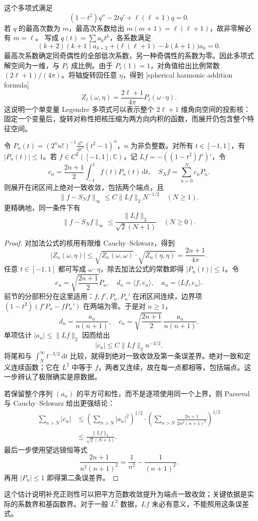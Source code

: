 \ProseParagraphBreak

这个多项式满足
\[
 (1-t^2)q''-2tq'+\ell(\ell+1)q=0.
\]
若 \(q\) 的最高次数为 \(m\)，最高次系数给出
\(m(m+1)=\ell(\ell+1)\)，故非零解必有 \(m=\ell\)。
写成 \(q(t)=\sum a_kt^k\)，各系数满足
\[
 (k+2)(k+1)a_{k+2}
       +\bigl(\ell(\ell+1)-k(k+1)\bigr)a_k=0.
\]
最高次系数确定同奇偶性的全部低次系数，另一种奇偶性的系数为零。因此多项式解空间为一维，与
\(P_\ell\) 成比例。由于 \(P_\ell(1)=1\)，对角值给出比例常数
\((2\ell+1)/(4\pi)\)。将轴旋转回任意 \(\eta\)，得到
[spherical harmonic addition formula]
\[
 Z_\ell(\omega,\eta)
       =\frac{2\ell+1}{4\pi}P_\ell(\omega\cdot\eta).
\]
这说明一个单变量 Legendre 多项式可以表示整个
\(2\ell+1\) 维角向空间的投影核：固定一个变量后，旋转对称性把核压缩为两方向内积的函数，而展开仍包含整个特征空间。

\begin{proposition}\label{b2:prop:B2-legendre-uniform}
令 \(P_n(t)=(2^nn!)^{-1}\frac{\mathrm d^n}{\mathrm dt^n}(t^2-1)^n\)，\(n\) 为非负整数。对所有 \(t\in[-1,1]\)，有 \(|P_n(t)|\leq1\)。若 \(f\in C^2([-1,1];\mathbb C)\)，记 \(Lf=-((1-t^2)f')'\)，令
\[
 c_n=\frac{2n+1}{2}\int_{-1}^1f(t)P_n(t)\,\mathrm dt,
 \quad S_Nf=\sum_{n=0}^Nc_nP_n.
\]
则展开在闭区间上绝对一致收敛，包括两个端点，且
\[
 \|f-S_Nf\|_\infty\leq C\|Lf\|_2N^{-1/2}
 \quad(N\geq1).
\]
更精确地，同一条件下有
\[
 \|f-S_Nf\|_\infty
       \leq\frac{\|Lf\|_2}{\sqrt2(N+1)}
 \quad(N\geq0).
\]
\end{proposition}
\begin{proof}
对加法公式的核用有限维 Cauchy--Schwarz，得到
\[
 |Z_n(\omega,\eta)|
 \leq\sqrt{Z_n(\omega,\omega)}
       \cdot\sqrt{Z_n(\eta,\eta)}
 =\frac{2n+1}{4\pi}.
\]
任意 \(t\in[-1,1]\) 都可写成 \(\omega\cdot\eta\)，除去加法公式的常数即得 \(|P_n(t)|\leq1\)。令
\[
 e_n=\sqrt{\frac{2n+1}{2}}P_n,
 \quad d_n=\langle f,e_n\rangle,
 \quad a_n=\langle Lf,e_n\rangle.
\]
前节的分部积分在这里适用：\(f,f',P_n,P_n'\) 在闭区间连续，边界项
\((1-t^2)(f'P_n-fP_n')\) 在两端为零。于是对 \(n\geq1\)，
\[
 d_n=\frac{a_n}{n(n+1)},\quad
 c_n=\sqrt{\frac{2n+1}{2}}\,
              \frac{a_n}{n(n+1)}.
\]
单项估计 \(|a_n|\leq\|Lf\|_2\) 因而给出
\[
 |c_n|\leq C\|Lf\|_2n^{-3/2}.
\]
将尾和与 \(\int_N^\infty t^{-3/2}\,\mathrm dt\) 比较，就得到绝对一致收敛及第一条误差界。绝对一致和定义连续函数；它在 \(L^2\) 中等于 \(f\)，两者又连续，故在每一点都相等，包括端点。这一步辨认了极限确实是原数据。

若保留整个序列 \((a_n)\) 的平方可和性，而不是逐项使用同一个上界，则 Parseval 与 Cauchy--Schwarz 给出更强结论：
\[
 \begin{aligned}
 \sum_{n>N}|c_n|
 &\leq
 \left(\sum_{n>N}|a_n|^2\right)^{1/2}
 \cdot
 \left(\sum_{n>N}
       \frac{2n+1}{2n^2(n+1)^2}\right)^{1/2}\\
 &\leq\frac{\|Lf\|_2}{\sqrt2(N+1)}.
 \end{aligned}
\]
最后一步使用望远镜恒等式
\[
 \frac{2n+1}{n^2(n+1)^2}
       =\frac1{n^2}-\frac1{(n+1)^2}.
\]
再用 \(|P_n|\leq1\) 即得第二条误差界。
\end{proof}
这个估计说明补充正则性可以把平方范数收敛提升为端点一致收敛；关键依据是实际的系数界和基函数界。对于一般 \(L^2\) 数据，\(Lf\) 未必有意义，不能照用这条误差式。


